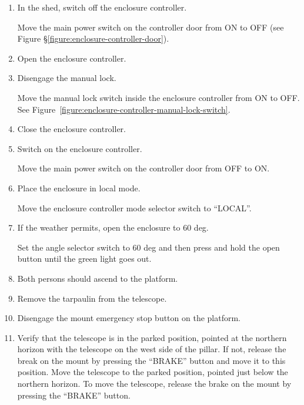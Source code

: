 \begin{enumerate}

\item
In the shed, switch off the enclosure controller.

Move the main power switch on the controller door from ON to OFF (see Figure \S\ref{figure:enclosure-controller-door}).

\item
Open the enclosure controller.

\item
Disengage the manual lock.

Move the manual lock switch inside the enclosure controller from ON to OFF. See Figure~\ref{figure:enclosure-controller-manual-lock-switch}.

\item
Close the enclosure controller.

\item
Switch on the enclosure controller.

Move the main power switch on the controller door from OFF to ON.

\item
Place the enclosure in local mode.

Move the enclosure controller mode selector switch to “LOCAL”.

\item
If the weather permits, open the enclosure to 60 deg.

Set the angle selector switch to 60 deg and then press and hold the open button until the green light goes out.

\item
Both persons should ascend to the platform.

\item
Remove the tarpaulin from the telescope.

\item Disengage the mount emergency stop button on the platform.

\item
\ifcoatli
Verify that the telescope is in the parked position, pointed at the northern horizon with the telescope on the west side of the pillar. If not, release the break on the mount by pressing the “BRAKE” button and move it to this position.
\fi
\ifddoti
Move the telescope to the parked position, pointed just below the northern horizon. To move the telescope, release the brake on the mount by pressing the “BRAKE” button.
\fi


\end{enumerate}
